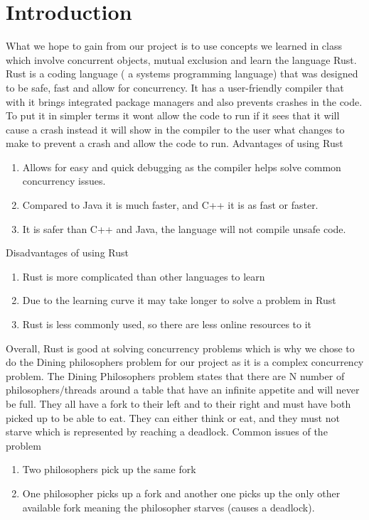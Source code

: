 \documentclass[conference]{IEEEtran}
\begin{document}
	\section{Introduction}
	What we hope to gain from our project is to use concepts we learned in class which involve concurrent objects, mutual exclusion and learn the language Rust. Rust is a coding language ( a systems programming language) that was designed to be safe, fast and allow for concurrency.  It has a user-friendly compiler that with it brings integrated package managers and also prevents crashes in the code. To put it in simpler terms it wont allow the code to run if it sees that it will cause a crash instead it will show in the compiler to the user what changes to make to prevent a crash and allow the code to run.
	\linebreak
	\linebreak
	Advantages of using Rust
	\begin{enumerate}
		\item Allows for easy and quick debugging as the compiler helps solve common concurrency issues.
		\item Compared to Java it is much faster, and C++ it is as fast or faster.
		\item It is safer than C++ and Java, the language will not compile unsafe code.
	\end{enumerate}
	Disadvantages of using Rust
	\begin{enumerate}
		\item Rust is more complicated than other languages to learn
		\item Due to the learning curve it may take longer to solve a problem in Rust
		\item Rust is less commonly used, so there are less online resources to it
	\end{enumerate}
	Overall, Rust is good at solving concurrency problems which is why we chose to do the Dining philosophers problem for our project as it is a complex concurrency problem. The Dining Philosophers problem states that there are N number of philosophers/threads around a table that have an infinite appetite and will never be full. They all have a fork to their left and to their right and must have both picked up to be able to eat. They can either think or eat, and they must not starve which is represented by reaching a deadlock.
	\linebreak
	\linebreak
	Common issues of the problem
	\begin{enumerate}
		\item Two philosophers pick up the same fork
		\item One philosopher picks up a fork and another one picks up the only other available fork meaning the philosopher starves (causes a deadlock).
	\end{enumerate}
\end{document}
